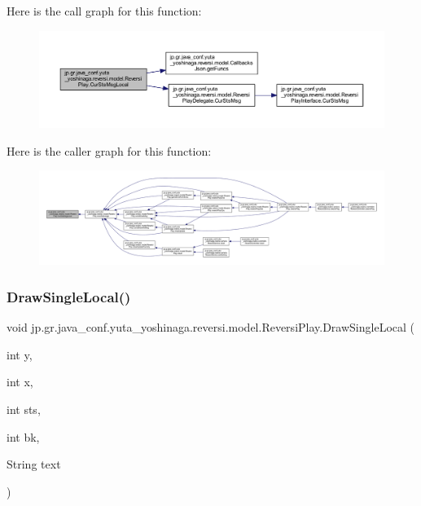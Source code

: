 Here is the call graph for this function\+:
\nopagebreak
\begin{figure}[H]
\begin{center}
\leavevmode
\includegraphics[width=350pt]{classjp_1_1gr_1_1java__conf_1_1yuta__yoshinaga_1_1reversi_1_1model_1_1_reversi_play_a4c4d14ddaf65d3643bd7edc7b562f4d1_cgraph}
\end{center}
\end{figure}
Here is the caller graph for this function\+:
\nopagebreak
\begin{figure}[H]
\begin{center}
\leavevmode
\includegraphics[width=350pt]{classjp_1_1gr_1_1java__conf_1_1yuta__yoshinaga_1_1reversi_1_1model_1_1_reversi_play_a4c4d14ddaf65d3643bd7edc7b562f4d1_icgraph}
\end{center}
\end{figure}
\mbox{\label{classjp_1_1gr_1_1java__conf_1_1yuta__yoshinaga_1_1reversi_1_1model_1_1_reversi_play_a0218c589d8567d52f92ab87bc4bec30f}} 
\subsubsection{\texorpdfstring{Draw\+Single\+Local()}{DrawSingleLocal()}}
{\footnotesize\ttfamily void jp.\+gr.\+java\+\_\+conf.\+yuta\+\_\+yoshinaga.\+reversi.\+model.\+Reversi\+Play.\+Draw\+Single\+Local (\begin{DoxyParamCaption}\item[{int}]{y,  }\item[{int}]{x,  }\item[{int}]{sts,  }\item[{int}]{bk,  }\item[{String}]{text }\end{DoxyParamCaption})\hspace{0.3cm}{\ttfamily [private]}}



